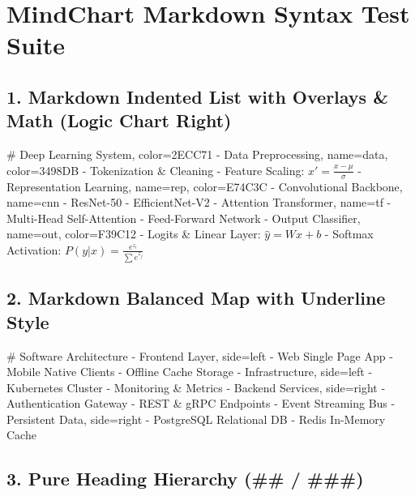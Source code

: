 \documentclass{article}
\begin{document}
\section*{MindChart Markdown Syntax Test Suite}

\subsection*{1. Markdown Indented List with Overlays \& Math (Logic Chart Right)}

\begin{mindchart}[layout=right, theme=rainbow, style=classic, line=curve, scale=0.72]
# Deep Learning System, color=2ECC71
  - Data Preprocessing, name=data, color=3498DB
    - Tokenization \& Cleaning
    - Feature Scaling: $x' = \frac{x - \mu}{\sigma}$
  - Representation Learning, name=rep, color=E74C3C
    - Convolutional Backbone, name=cnn
      - ResNet-50
      - EfficientNet-V2
    - Attention Transformer, name=tf
      - Multi-Head Self-Attention
      - Feed-Forward Network
  - Output Classifier, name=out, color=F39C12
    - Logits \& Linear Layer: $\hat{y} = Wx + b$
    - Softmax Activation: $P(y|x) = \frac{e^{z_i}}{\sum e^{z_j}}$
\end{mindchart}

\newpage

\subsection*{2. Markdown Balanced Map with Underline Style}

\begin{mindchart}[layout=balanced, theme=forest, style=underline, line=curve, scale=0.78]
# Software Architecture
  - Frontend Layer, side=left
    - Web Single Page App
    - Mobile Native Clients
    - Offline Cache Storage
  - Infrastructure, side=left
    - Kubernetes Cluster
    - Monitoring \& Metrics
  - Backend Services, side=right
    - Authentication Gateway
    - REST \& gRPC Endpoints
    - Event Streaming Bus
  - Persistent Data, side=right
    - PostgreSQL Relational DB
    - Redis In-Memory Cache
\end{mindchart}

\bigskip

\subsection*{3. Pure Heading Hierarchy (\#\# / \#\#\#)}
\end{document}
